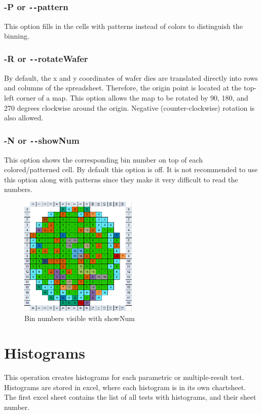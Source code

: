\documentclass[letterpaper]{article}
\begin{document}
\subsubsection{\bf -P or \texttt{-{}-}pattern}
This option fills in the cells with patterns instead of colors to distinguish the binning.
\subsubsection{\bf -R or \texttt{-{}-}rotateWafer}
By default, the x and y coordinates of wafer dies are translated directly into rows and columns of the spreadsheet. Therefore, the origin point is located at the top-left corner of a map. This option allows the map to be rotated by 90, 180, and 270 degrees clockwise around the origin. Negative (counter-clockwise) rotation is also allowed.
\subsubsection{\bf -N or \texttt{-{}-}showNum}
This option shows the corresponding bin number on top of each colored/patterned cell. By default this option is off. It is not recommended to use this option along with patterns since they make it very difficult to read the numbers.
\begin{figure}[H]
	\centering
	\includegraphics[width=0.5\textwidth]{showNum.png}
	\caption{Bin numbers visible with showNum}
	\label{fig:showNum}
\end{figure}

\section{\bf Histograms}
This operation creates histograms for each parametric or multiple-result test. Histograms are stored in excel, where each histogram is in its own chartsheet. The first excel sheet contains the list of all tests with histograms, and their sheet number.
\end{document}
